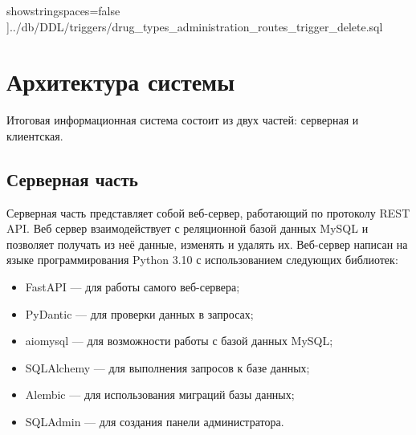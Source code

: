 \documentclass[a4paper]{article}
\newcommand{\dbtableref}[1]{\textit{#1}}
\begin{document}
				showstringspaces=false
			]{../db/DDL/triggers/drug_types_administration_routes_trigger_delete.sql}
			
			
			
	
	\newpage
	
	\section{Архитектура системы}
		Итоговая информационная система состоит из двух частей: серверная и клиентская.

		\subsection{Серверная часть}
			Серверная часть представляет собой веб-сервер, работающий по протоколу REST API. Веб сервер взаимодействует с реляционной базой данных MySQL и позволяет получать из неё данные, изменять и удалять их. Веб-сервер написан на языке программирования Python 3.10 с использованием следующих библиотек:
			\begin{itemize}
				\item FastAPI --- для работы самого веб-сервера;
				
				\item PyDantic --- для проверки данных в запросах;
								
				\item aiomysql --- для возможности работы с базой данных MySQL;
								
				\item SQLAlchemy --- для выполнения запросов к базе данных;
											
				\item Alembic --- для использования миграций базы данных;
				
				\item SQLAdmin --- для создания панели администратора.
			\end{itemize}
			
\end{document}
